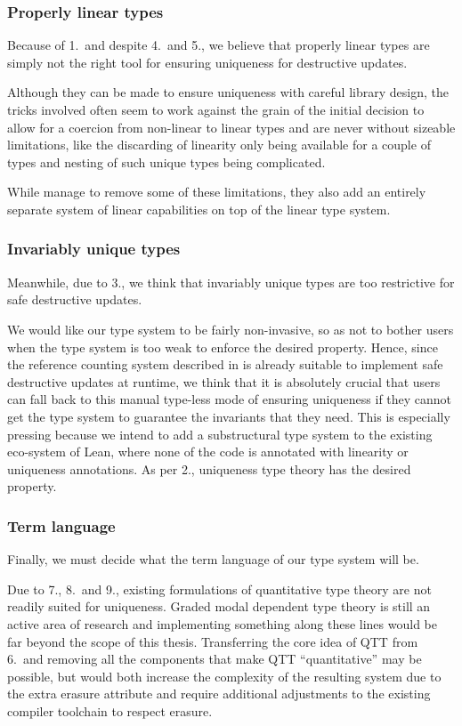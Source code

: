 \subsubsection{Properly linear types}
Because of 1.\ and despite 4.\ and 5., we believe that properly linear types are simply not the right tool for ensuring uniqueness for destructive updates. 

Although they can be made to ensure uniqueness with careful library design, the tricks involved often seem to work against the grain of the initial decision to allow for a coercion from non-linear to linear types and are never without sizeable limitations, like the discarding of linearity only being available for a couple of types and nesting of such unique types being complicated. 

While \cite{spiwack_linearly_2022} manage to remove some of these limitations, they also add an entirely separate system of linear capabilities on top of the linear type system.

\subsubsection{Invariably unique types}
Meanwhile, due to 3., we think that invariably unique types are too restrictive for safe destructive updates. 

We would like our type system to be fairly non-invasive, so as not to bother users when the type system is too weak to enforce the desired property. Hence, since the reference counting system described in  is already suitable to implement safe destructive updates at runtime, we think that it is absolutely crucial that users can fall back to this manual type-less mode of ensuring uniqueness if they cannot get the type system to guarantee the invariants that they need. This is especially pressing because we intend to add a substructural type system to the existing eco-system of Lean, where none of the code is annotated with linearity or uniqueness annotations. As per 2., uniqueness type theory has the desired property.

\subsubsection{Term language}
Finally, we must decide what the term language of our type system will be. 

Due to 7., 8.\ and 9., existing formulations of quantitative type theory are not readily suited for uniqueness. Graded modal dependent type theory \citep{moon_graded_2021} is still an active area of research and implementing something along these lines would be far beyond the scope of this thesis. Transferring the core idea of QTT from 6.\ and removing all the components that make QTT ``quantitative'' may be possible, but would both increase the complexity of the resulting system due to the extra erasure attribute and require additional adjustments to the existing compiler toolchain to respect erasure. 

